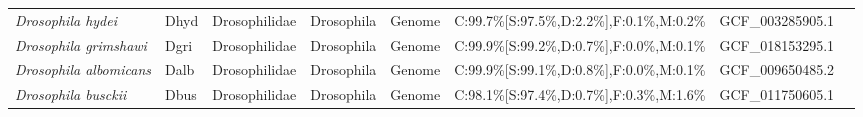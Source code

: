 \documentclass[../main.tex]{subfiles}
\begin{document}
\begin{landscape}
\begin{longtable}{llllllll}
		\textit{Drosophila hydei}         & Dhyd        & Drosophilidae   & Drosophila        & Genome        & C:99.7\%{[}S:97.5\%,D:2.2\%{]},F:0.1\%,M:0.2\%  & GCF\_003285905.1       & \textbf{\cite{dong2022new}}              \\
		\textit{Drosophila grimshawi}     & Dgri        & Drosophilidae   & Drosophila        & Genome        & C:99.9\%{[}S:99.2\%,D:0.7\%{]},F:0.0\%,M:0.1\%  & GCF\_018153295.1       & \textbf{\cite{kim2021highly}}            \\
		\textit{Drosophila albomicans}    & Dalb        & Drosophilidae   & Drosophila        & Genome        & C:99.9\%{[}S:99.1\%,D:0.8\%{]},F:0.0\%,M:0.1\%  & GCF\_009650485.2       & \textbf{\cite{mai2020patterns}}          \\
		\textit{Drosophila busckii}       & Dbus        & Drosophilidae   & Drosophila        & Genome        & C:98.1\%{[}S:97.4\%,D:0.7\%{]},F:0.3\%,M:1.6\%  & GCF\_011750605.1       & \textbf{\cite{renschler2019hi}}          \\* \midrule
	\end{longtable}
\end{landscape}
\end{document}
